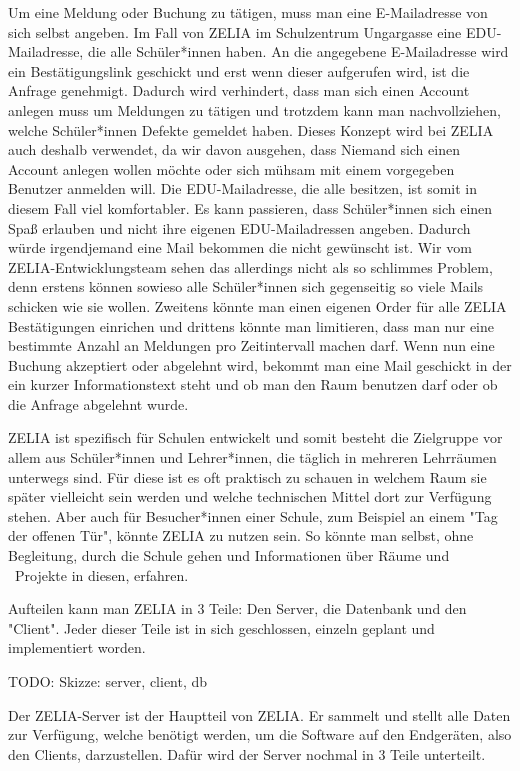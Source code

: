 Um eine Meldung oder Buchung zu tätigen, muss man eine E-Mailadresse von sich selbst angeben. Im Fall von ZELIA im Schulzentrum Ungargasse eine EDU-Mailadresse, die alle Schüler*innen haben. An die angegebene E-Mailadresse wird ein Bestätigungslink geschickt und erst wenn dieser aufgerufen wird, ist die Anfrage genehmigt. Dadurch wird verhindert, dass man sich einen Account anlegen muss um Meldungen zu tätigen und trotzdem kann man nachvollziehen, welche Schüler*innen Defekte gemeldet haben. Dieses Konzept wird bei ZELIA auch deshalb verwendet, da wir davon ausgehen, dass Niemand sich einen Account anlegen wollen möchte oder sich mühsam mit einem vorgegeben Benutzer anmelden will. Die EDU-Mailadresse, die alle besitzen, ist somit in diesem Fall viel komfortabler. Es kann passieren, dass Schüler*innen sich einen Spaß erlauben und nicht ihre eigenen EDU-Mailadressen angeben. Dadurch würde irgendjemand eine Mail bekommen die nicht gewünscht ist. Wir vom ZELIA-Entwicklungsteam sehen das allerdings nicht als so schlimmes Problem, denn erstens können sowieso alle Schüler*innen sich gegenseitig so viele Mails schicken wie sie wollen. Zweitens könnte man einen eigenen Order für alle ZELIA Bestätigungen einrichen und drittens könnte man limitieren, dass man nur eine bestimmte Anzahl an Meldungen pro Zeitintervall machen darf. Wenn nun eine Buchung akzeptiert oder abgelehnt wird, bekommt man eine Mail geschickt in der ein kurzer Informationstext steht und ob man den Raum benutzen darf oder ob die Anfrage abgelehnt wurde.

ZELIA ist spezifisch für Schulen entwickelt und somit besteht die Zielgruppe vor allem aus Schüler*innen und Lehrer*innen, die täglich in mehreren Lehrräumen unterwegs sind. Für diese ist es oft praktisch zu schauen in welchem Raum sie später vielleicht sein werden und welche technischen Mittel dort zur Verfügung stehen. Aber auch für Besucher*innen einer Schule, zum Beispiel an einem "Tag der offenen Tür", könnte ZELIA zu nutzen sein. So könnte man selbst, ohne Begleitung, durch die Schule gehen und Informationen über Räume und \zb\ Projekte in diesen, erfahren.

Aufteilen kann man ZELIA in 3 Teile: Den Server, die Datenbank und den "Client". Jeder dieser Teile ist in sich geschlossen, einzeln geplant und implementiert worden.

TODO: Skizze: server, client, db


Der ZELIA-Server ist der Hauptteil von ZELIA. Er sammelt und stellt alle Daten zur Verfügung, welche benötigt werden, um die Software auf den Endgeräten, also den Clients, darzustellen. Dafür wird der Server nochmal in 3 Teile unterteilt.


